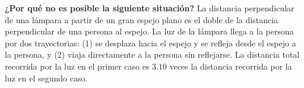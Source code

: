 \item \textbf{¿Por qué no es posible la siguiente situación?}
La distancia perpendicular de una lámpara a partir de un gran espejo plano es el doble de la distancia perpendicular de una persona al espejo. La luz de la lámpara llega a la persona por dos trayectorias: (1) se desplaza hacia el espejo y se refleja desde el espejo a la persona, y (2) viaja directamente a la persona sin reflejarse. La distancia total recorrida por la luz en el primer caso es $3.10$ veces la distancia recorrida por la luz en el segundo caso.
